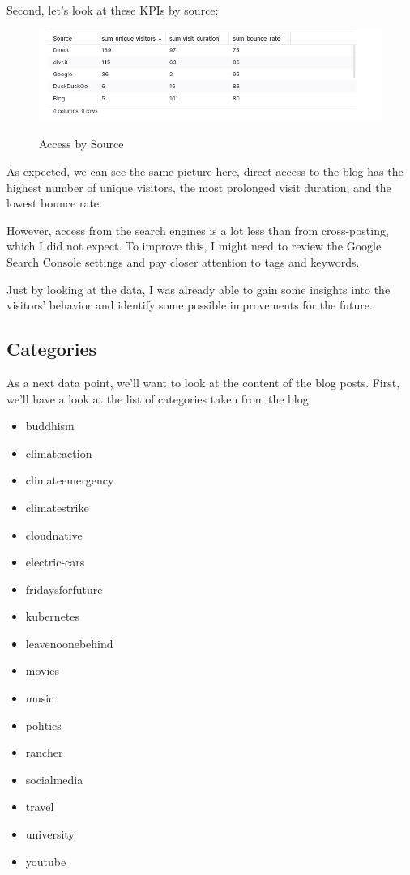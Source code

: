 Second, let's look at these KPIs by source:

\begin{figure}[H]
\centering
\caption {Access by Source}
\includegraphics[width=\linewidth]{images/access-source.png}
\label{fig:accessSource}
\end{figure}

As expected, we can see the same picture here, direct access to the blog has the highest number of unique visitors, the most prolonged visit duration, and the lowest bounce rate.

However, access from the search engines is a lot less than from cross-posting, which I did not expect. To improve this, I might need to review the Google Search Console settings and pay closer attention to tags and keywords.

Just by looking at the data, I was already able to gain some insights into the visitors' behavior and identify some possible improvements for the future.

\subsection{Categories}

As a next data point, we'll want to look at the content of the blog posts. First, we'll have a look at the list of categories taken from the blog:

\begin{itemize}
\item buddhism
\item climateaction
\item climateemergency
\item climatestrike
\item cloudnative
\item electric-cars
\item fridaysforfuture
\item kubernetes
\item leavenoonebehind
\item movies
\item music
\item politics
\item rancher
\item socialmedia
\item travel
\item university
\item youtube
\end{itemize}

